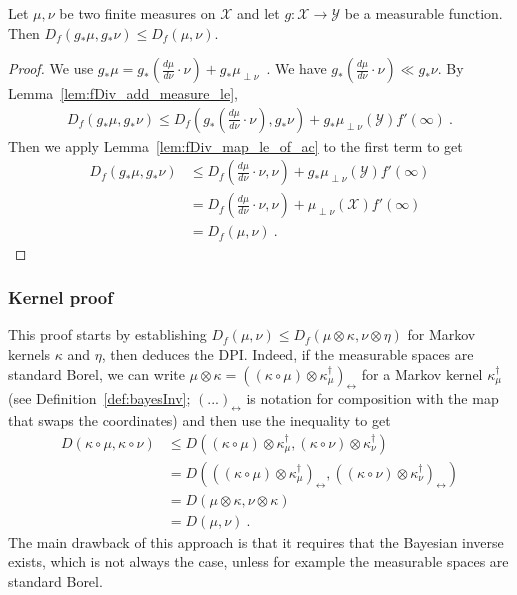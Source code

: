 \begin{theorem}
  \label{thm:fDiv_map_le}
  Let $\mu, \nu$ be two finite measures on $\mathcal X$ and let $g : \mathcal X \to \mathcal Y$ be a measurable function. Then
  $D_f(g_* \mu, g_* \nu) \le D_f(\mu, \nu)$.
\end{theorem}

\begin{proof}%
{}
We use $g_*\mu = g_*(\frac{d\mu}{d\nu}\cdot \nu) + g_*\mu_{\perp \nu}$~. 
We have $g_*(\frac{d\mu}{d\nu}\cdot \nu) \ll g_*\nu$.
By Lemma~\ref{lem:fDiv_add_measure_le},
\begin{align*}
D_f(g_* \mu, g_* \nu)
\le D_f\left(g_*(\frac{d\mu}{d\nu}\cdot \nu), g_*\nu\right)
  + g_*\mu_{\perp \nu}(\mathcal Y) f'(\infty)
\: .
\end{align*}
Then we apply Lemma~\ref{lem:fDiv_map_le_of_ac} to the first term to get
\begin{align*}
D_f(g_* \mu, g_* \nu)
&\le D_f\left(\frac{d\mu}{d\nu}\cdot \nu, \nu\right)
  + g_*\mu_{\perp \nu}(\mathcal Y) f'(\infty)
\\
&= D_f\left(\frac{d\mu}{d\nu}\cdot \nu, \nu\right)
  + \mu_{\perp \nu}(\mathcal X) f'(\infty)
\\
&= D_f(\mu, \nu)
\: .
\end{align*}
\end{proof}


\subsubsection{Kernel proof}

This proof starts by establishing $D_f(\mu, \nu) \le D_f(\mu \otimes \kappa, \nu \otimes \eta)$ for Markov kernels $\kappa$ and $\eta$, then deduces the DPI.
Indeed, if the measurable spaces are standard Borel, we can write $\mu \otimes \kappa = ((\kappa \circ \mu) \otimes \kappa^\dagger_\mu)_\leftrightarrow$ for a Markov kernel $\kappa^\dagger_\mu$ (see Definition~\ref{def:bayesInv}; $(...)_\leftrightarrow$ is notation for composition with the map that swaps the coordinates) and then use the inequality to get
\begin{align*}
D(\kappa \circ \mu, \kappa \circ \nu)
&\le D((\kappa \circ \mu) \otimes \kappa^\dagger_\mu, (\kappa \circ \nu) \otimes \kappa^\dagger_\nu)
\\
&= D(((\kappa \circ \mu) \otimes \kappa^\dagger_\mu)_{\leftrightarrow}, ((\kappa \circ \nu) \otimes \kappa^\dagger_\nu)_{\leftrightarrow})
\\
&= D(\mu \otimes \kappa, \nu \otimes \kappa)
\\
&= D(\mu, \nu)
\: .
\end{align*}
The main drawback of this approach is that it requires that the Bayesian inverse exists, which is not always the case, unless for example the measurable spaces are standard Borel.

